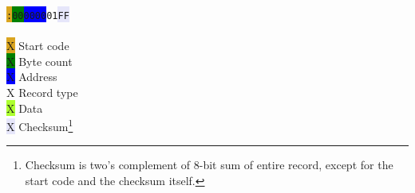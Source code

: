         \indent\texttt{\colorbox{Goldenrod}{:}\colorbox{green}{00}\colorbox{blue}{0000}\colorbox{Apricot}{01}\colorbox{Lavender}{FF}}\\\\
        \indent\colorbox{Goldenrod}{\color{Goldenrod}X} Start code\\
        \indent\colorbox{green}{\color{green}X} Byte count\\
        \indent\colorbox{blue}{\color{blue}X} Address\\
        \indent\colorbox{Apricot}{\color{Apricot}X} Record type\\
        \indent\colorbox{GreenYellow}{\color{GreenYellow}X} Data\\
        \indent\colorbox{Lavender}{\color{Lavender}X} Checksum\footnote{Checksum is two's complement of 8-bit sum of entire record, except for the start code and the checksum itself.}
